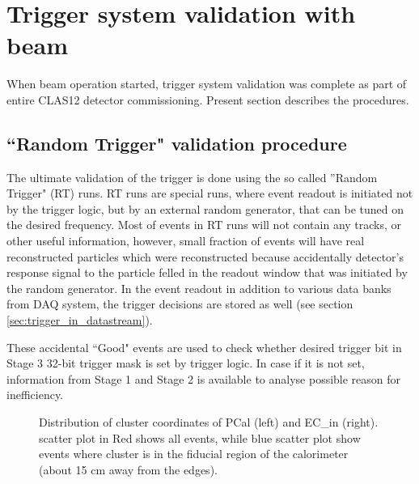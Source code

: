 \section{Trigger system validation with beam}
\label{sec:validation}

When beam operation started, trigger system validation was complete as part of entire CLAS12 detector commissioning. Present section describes the procedures. 

\subsection{``Random Trigger" validation procedure}
\label{sec:validation_random}

The ultimate validation of the trigger is done using the so called ''Random Trigger" (RT) runs. RT runs are special runs, where event readout is initiated not by the trigger logic, but by an external random generator, that can be tuned on the desired frequency. Most of events in RT runs will not contain any tracks, or other useful information, however, small fraction of events will have real reconstructed particles which were reconstructed because accidentally detector's response signal to the particle felled in the readout window that was initiated by the random generator. In the event readout in addition to various data banks from DAQ system, the trigger decisions are stored as well (see section \ref{sec:trigger_in_datastream}).

These accidental ``Good" events are used to check whether desired trigger bit in Stage 3 32-bit trigger mask is set by trigger logic. In case if it is not set, information from Stage 1 and Stage 2 is available to analyse possible reason for inefficiency.

\begin{figure}[!htb]
	\centering
	\caption{Distribution of cluster coordinates of PCal (left) and EC\_{in} (right).
		scatter plot in Red shows all events, while blue scatter plot show events where cluster
		is in the fiducial region of the calorimeter (about 15 cm away from the edges).}
\end{figure}

